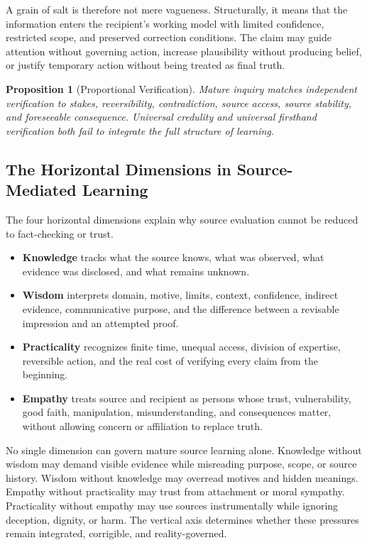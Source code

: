 \documentclass[11pt]{article}
\newtheorem{proposition}{Proposition}
\begin{document}
A grain of salt is therefore not mere vagueness. Structurally, it means that the information enters the recipient's working model with limited confidence, restricted scope, and preserved correction conditions. The claim may guide attention without governing action, increase plausibility without producing belief, or justify temporary action without being treated as final truth.

\begin{proposition}[Proportional Verification]
Mature inquiry matches independent verification to stakes, reversibility, contradiction, source access, source stability, and foreseeable consequence. Universal credulity and universal firsthand verification both fail to integrate the full structure of learning.
\end{proposition}

\subsection{The Horizontal Dimensions in Source-Mediated Learning}

The four horizontal dimensions explain why source evaluation cannot be reduced to fact-checking or trust.

\begin{itemize}
    \item \textbf{Knowledge} tracks what the source knows, what was observed, what evidence was disclosed, and what remains unknown.
    \item \textbf{Wisdom} interprets domain, motive, limits, context, confidence, indirect evidence, communicative purpose, and the difference between a revisable impression and an attempted proof.
    \item \textbf{Practicality} recognizes finite time, unequal access, division of expertise, reversible action, and the real cost of verifying every claim from the beginning.
    \item \textbf{Empathy} treats source and recipient as persons whose trust, vulnerability, good faith, manipulation, misunderstanding, and consequences matter, without allowing concern or affiliation to replace truth.
\end{itemize}

No single dimension can govern mature source learning alone. Knowledge without wisdom may demand visible evidence while misreading purpose, scope, or source history. Wisdom without knowledge may overread motives and hidden meanings. Empathy without practicality may trust from attachment or moral sympathy. Practicality without empathy may use sources instrumentally while ignoring deception, dignity, or harm. The vertical axis determines whether these pressures remain integrated, corrigible, and reality-governed.
\end{document}
